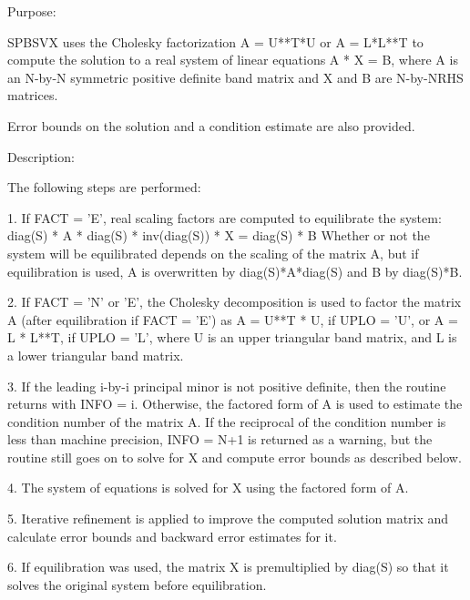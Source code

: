  \begin{DoxyParagraph}{Purpose\+: }
\begin{DoxyVerb} SPBSVX uses the Cholesky factorization A = U**T*U or A = L*L**T to
 compute the solution to a real system of linear equations
    A * X = B,
 where A is an N-by-N symmetric positive definite band matrix and X
 and B are N-by-NRHS matrices.

 Error bounds on the solution and a condition estimate are also
 provided.\end{DoxyVerb}
 
\end{DoxyParagraph}
\begin{DoxyParagraph}{Description\+: }
\begin{DoxyVerb} The following steps are performed:

 1. If FACT = 'E', real scaling factors are computed to equilibrate
    the system:
       diag(S) * A * diag(S) * inv(diag(S)) * X = diag(S) * B
    Whether or not the system will be equilibrated depends on the
    scaling of the matrix A, but if equilibration is used, A is
    overwritten by diag(S)*A*diag(S) and B by diag(S)*B.

 2. If FACT = 'N' or 'E', the Cholesky decomposition is used to
    factor the matrix A (after equilibration if FACT = 'E') as
       A = U**T * U,  if UPLO = 'U', or
       A = L * L**T,  if UPLO = 'L',
    where U is an upper triangular band matrix, and L is a lower
    triangular band matrix.

 3. If the leading i-by-i principal minor is not positive definite,
    then the routine returns with INFO = i. Otherwise, the factored
    form of A is used to estimate the condition number of the matrix
    A.  If the reciprocal of the condition number is less than machine
    precision, INFO = N+1 is returned as a warning, but the routine
    still goes on to solve for X and compute error bounds as
    described below.

 4. The system of equations is solved for X using the factored form
    of A.

 5. Iterative refinement is applied to improve the computed solution
    matrix and calculate error bounds and backward error estimates
    for it.

 6. If equilibration was used, the matrix X is premultiplied by
    diag(S) so that it solves the original system before
    equilibration.\end{DoxyVerb}
 
\end{DoxyParagraph}

